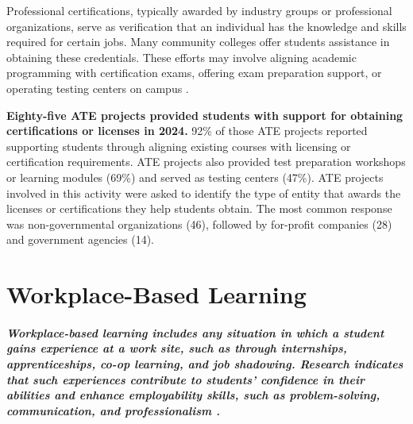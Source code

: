 \documentclass[
]{report}
\begin{document}
Professional certifications, typically awarded by industry groups or professional organizations, serve as verification that an individual has the knowledge and skills required for certain jobs. Many community colleges offer students assistance in obtaining these credentials. These efforts may involve aligning academic programming with certification exams, offering exam preparation support, or operating testing centers on campus \autocite{nas2017building}.

\textbf{Eighty-five ATE projects provided students with support for obtaining certifications or licenses in 2024.} 92\% of those ATE projects reported supporting students through aligning existing courses with licensing or certification requirements. ATE projects also provided test preparation workshops or learning modules (69\%) and served as testing centers (47\%). ATE projects involved in this activity were asked to identify the type of entity that awards the licenses or certifications they help students obtain. The most common response was non-governmental organizations (46), followed by for-profit companies (28) and government agencies (14).

\hypertarget{workplace-based-learning}{%
\chapter{Workplace-Based Learning}\label{workplace-based-learning}}

\hypertarget{workplace-based-learning-includes-any-situation-in-which-a-student-gains-experience-at-a-work-site-such-as-through-internships-apprenticeships-co-op-learning-and-job-shadowing.-research-indicates-that-such-experiences-contribute-to-students-confidence-in-their-abilities-and-enhance-employability-skills-such-as-problem-solving-communication-and-professionalism-jackson2014employability.}{%
\paragraph{\texorpdfstring{Workplace-based learning includes any situation in which a student gains experience at a work site, such as through internships, apprenticeships, co-op learning, and job shadowing. Research indicates that such experiences contribute to students' confidence in their abilities and enhance employability skills, such as problem-solving, communication, and professionalism \autocite{jackson2014employability}.}{Workplace-based learning includes any situation in which a student gains experience at a work site, such as through internships, apprenticeships, co-op learning, and job shadowing. Research indicates that such experiences contribute to students' confidence in their abilities and enhance employability skills, such as problem-solving, communication, and professionalism {[}@jackson2014employability{]}.}}\label{workplace-based-learning-includes-any-situation-in-which-a-student-gains-experience-at-a-work-site-such-as-through-internships-apprenticeships-co-op-learning-and-job-shadowing.-research-indicates-that-such-experiences-contribute-to-students-confidence-in-their-abilities-and-enhance-employability-skills-such-as-problem-solving-communication-and-professionalism-jackson2014employability.}}
\end{document}
